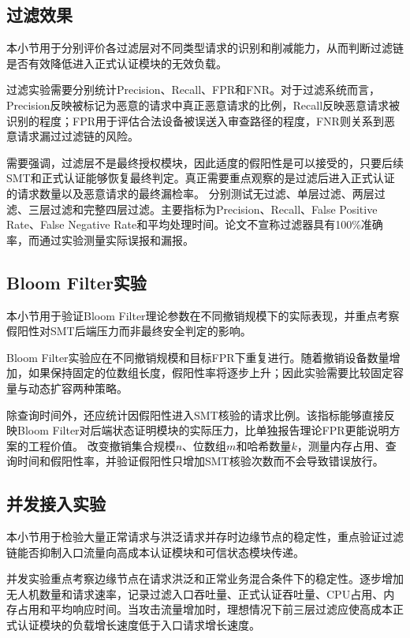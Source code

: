 \documentclass[conference]{IEEEtran}
\begin{document}
	\subsection{过滤效果}
	
	本小节用于分别评价各过滤层对不同类型请求的识别和削减能力，从而判断过滤链是否有效降低进入正式认证模块的无效负载。
	
	过滤实验需要分别统计Precision、Recall、FPR和FNR。对于过滤系统而言，Precision反映被标记为恶意的请求中真正恶意请求的比例，Recall反映恶意请求被识别的程度；FPR用于评估合法设备被误送入审查路径的程度，FNR则关系到恶意请求漏过过滤链的风险。
	
	需要强调，过滤层不是最终授权模块，因此适度的假阳性是可以接受的，只要后续SMT和正式认证能够恢复最终判定。真正需要重点观察的是过滤后进入正式认证的请求数量以及恶意请求的最终漏检率。
	分别测试无过滤、单层过滤、两层过滤、三层过滤和完整四层过滤。主要指标为Precision、Recall、False Positive Rate、False Negative Rate和平均处理时间。论文不宣称过滤器具有100\%准确率，而通过实验测量实际误报和漏报。
	
	\subsection{Bloom Filter实验}
	
	本小节用于验证Bloom Filter理论参数在不同撤销规模下的实际表现，并重点考察假阳性对SMT后端压力而非最终安全判定的影响。
	
	Bloom Filter实验应在不同撤销规模和目标FPR下重复进行。随着撤销设备数量增加，如果保持固定的位数组长度，假阳性率将逐步上升；因此实验需要比较固定容量与动态扩容两种策略。
	
	除查询时间外，还应统计因假阳性进入SMT核验的请求比例。该指标能够直接反映Bloom Filter对后端状态证明模块的实际压力，比单独报告理论FPR更能说明方案的工程价值。
	改变撤销集合规模$n$、位数组$m$和哈希数量$k$，测量内存占用、查询时间和假阳性率，并验证假阳性只增加SMT核验次数而不会导致错误放行。
	
	\subsection{并发接入实验}
	
	本小节用于检验大量正常请求与洪泛请求并存时边缘节点的稳定性，重点验证过滤链能否抑制入口流量向高成本认证模块和可信状态模块传递。
	
	并发实验重点考察边缘节点在请求洪泛和正常业务混合条件下的稳定性。逐步增加无人机数量和请求速率，记录过滤入口吞吐量、正式认证吞吐量、CPU占用、内存占用和平均响应时间。当攻击流量增加时，理想情况下前三层过滤应使高成本正式认证模块的负载增长速度低于入口请求增长速度。
	
\end{document}
